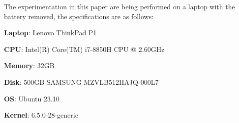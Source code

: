 The experimentation in this paper are being performed on a laptop with the battery removed, the specifications are as
follows:

\textbf{Laptop}: Lenovo ThinkPad P1

\textbf{CPU}: Intel(R) Core(TM) i7-8850H CPU @ 2.60GHz

\textbf{Memory}: 32GB

\textbf{Disk}: 500GB SAMSUNG MZVLB512HAJQ-000L7

\textbf{OS}: Ubuntu 23.10

\textbf{Kernel}: 6.5.0-28-generic
